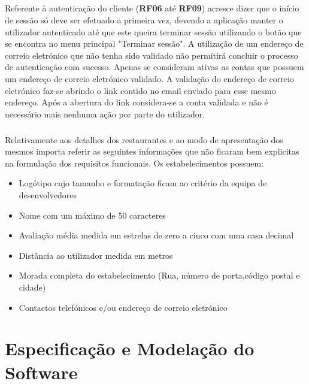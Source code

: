 \documentclass[a4paper,12pt]{scrreprt}
\begin{document}
\paragraph{}
Referente à autenticação do cliente (\textbf{RF06} até \textbf{RF09}) acresce dizer que o início de sessão só deve ser efetuado a primeira vez, devendo a aplicação manter o utilizador autenticado até que este queira terminar sessão utilizando o botão que se encontra no menu principal "Terminar sessão".
A utilização de um endereço de correio eletrónico que não tenha sido validado não permitirá concluir o processo de autenticação com sucesso. Apenas se consideram ativas as contas que possuem um endereço de correio eletrónico validado. A validação do endereço de correio eletrónico faz-se abrindo o link contido no email enviado para esse mesmo endereço. Após a abertura do link considera-se a conta validada e não é necessário mais nenhuma ação por parte do utilizador.
\paragraph{}
Relativamente aos detalhes dos restaurantes e ao modo de apresentação dos mesmos importa referir as seguintes informações que não ficaram bem explicitas na formulação dos requisitos funcionais.
Os estabelecimentos possuem:
\begin{itemize}
    \item Logótipo cujo tamanho e formatação ficam ao critério da equipa de desenvolvedores
    \item Nome com um máximo de 50 caracteres
    \item Avaliação média medida em estrelas de zero a cinco com uma casa decimal
    \item Distância ao utilizador medida em metros
    \item Morada completa do estabelecimento (Rua, número de porta,código postal e cidade)
    \item Contactos telefónicos e/ou endereço de correio eletrónico

\end{itemize}





        

\chapter{Especificação e Modelação do Software}
        
\end{document}
